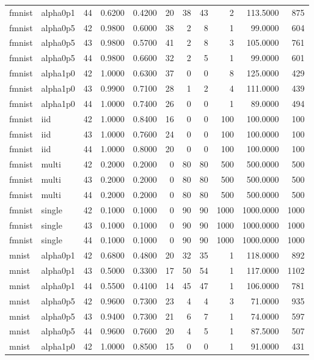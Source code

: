 \begin{tabular}{llrrrrrrrrr}
fmnist & alpha0p1 & 44 & 0.6200 & 0.4200 & 20 & 38 & 43 & 2 & 113.5000 & 875 \\
fmnist & alpha0p5 & 42 & 0.9800 & 0.6000 & 38 & 2 & 8 & 1 & 99.0000 & 604 \\
fmnist & alpha0p5 & 43 & 0.9800 & 0.5700 & 41 & 2 & 8 & 3 & 105.0000 & 761 \\
fmnist & alpha0p5 & 44 & 0.9800 & 0.6600 & 32 & 2 & 5 & 1 & 99.0000 & 601 \\
fmnist & alpha1p0 & 42 & 1.0000 & 0.6300 & 37 & 0 & 0 & 8 & 125.0000 & 429 \\
fmnist & alpha1p0 & 43 & 0.9900 & 0.7100 & 28 & 1 & 2 & 4 & 111.0000 & 439 \\
fmnist & alpha1p0 & 44 & 1.0000 & 0.7400 & 26 & 0 & 0 & 1 & 89.0000 & 494 \\
fmnist & iid & 42 & 1.0000 & 0.8400 & 16 & 0 & 0 & 100 & 100.0000 & 100 \\
fmnist & iid & 43 & 1.0000 & 0.7600 & 24 & 0 & 0 & 100 & 100.0000 & 100 \\
fmnist & iid & 44 & 1.0000 & 0.8000 & 20 & 0 & 0 & 100 & 100.0000 & 100 \\
fmnist & multi & 42 & 0.2000 & 0.2000 & 0 & 80 & 80 & 500 & 500.0000 & 500 \\
fmnist & multi & 43 & 0.2000 & 0.2000 & 0 & 80 & 80 & 500 & 500.0000 & 500 \\
fmnist & multi & 44 & 0.2000 & 0.2000 & 0 & 80 & 80 & 500 & 500.0000 & 500 \\
fmnist & single & 42 & 0.1000 & 0.1000 & 0 & 90 & 90 & 1000 & 1000.0000 & 1000 \\
fmnist & single & 43 & 0.1000 & 0.1000 & 0 & 90 & 90 & 1000 & 1000.0000 & 1000 \\
fmnist & single & 44 & 0.1000 & 0.1000 & 0 & 90 & 90 & 1000 & 1000.0000 & 1000 \\
mnist & alpha0p1 & 42 & 0.6800 & 0.4800 & 20 & 32 & 35 & 1 & 118.0000 & 892 \\
mnist & alpha0p1 & 43 & 0.5000 & 0.3300 & 17 & 50 & 54 & 1 & 117.0000 & 1102 \\
mnist & alpha0p1 & 44 & 0.5500 & 0.4100 & 14 & 45 & 47 & 1 & 106.0000 & 781 \\
mnist & alpha0p5 & 42 & 0.9600 & 0.7300 & 23 & 4 & 4 & 3 & 71.0000 & 935 \\
mnist & alpha0p5 & 43 & 0.9400 & 0.7300 & 21 & 6 & 7 & 1 & 74.0000 & 597 \\
mnist & alpha0p5 & 44 & 0.9600 & 0.7600 & 20 & 4 & 5 & 1 & 87.5000 & 507 \\
mnist & alpha1p0 & 42 & 1.0000 & 0.8500 & 15 & 0 & 0 & 1 & 91.0000 & 431 \\

\end{tabular}
